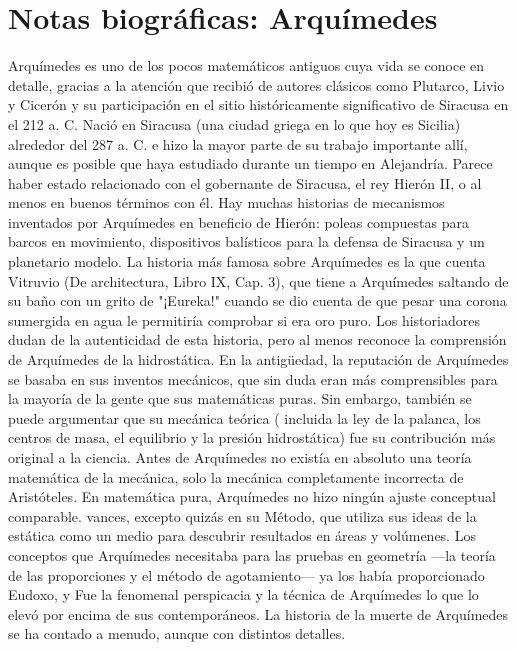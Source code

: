 \documentclass{book}
\begin{document}
    \section{Notas biográficas: Arquímedes}
    Arquímedes es uno de los pocos matemáticos antiguos cuya vida se conoce en detalle, gracias a 
    la atención que recibió de autores clásicos como Plutarco, Livio y Cicerón y su participación 
    en el sitio históricamente significativo de Siracusa en el 212 a. C. Nació en Siracusa 
    (una ciudad griega en lo que hoy es Sicilia) alrededor del 287 a. C. e hizo la mayor parte 
    de su trabajo importante allí, aunque es posible que haya estudiado durante un tiempo en 
    Alejandría. Parece haber estado relacionado con el gobernante de Siracusa, el rey Hierón 
    II, o al menos en buenos términos con él. Hay muchas historias de mecanismos inventados 
    por Arquímedes en beneficio de Hierón: poleas compuestas para barcos en movimiento, dispositivos 
    balísticos para la defensa de Siracusa y un planetario modelo. La historia más famosa 
    sobre Arquímedes es la que cuenta Vitruvio (De architectura, Libro IX, Cap. 3), que tiene a 
    Arquímedes saltando de su baño con un grito de "¡Eureka!" cuando se dio cuenta de que pesar 
    una corona sumergida en agua le permitiría comprobar si era oro puro. Los historiadores dudan 
    de la autenticidad de esta historia, pero al menos reconoce la comprensión de Arquímedes de la 
    hidrostática. En la antigüedad, la reputación de Arquímedes se basaba en sus inventos mecánicos, 
    que sin duda eran más comprensibles para la mayoría de la gente que
    sus matemáticas puras. Sin embargo, también se puede argumentar que su mecánica teórica (
    incluida la ley de la palanca, los centros de masa, el equilibrio y la presión hidrostática) 
    fue su contribución más original a la ciencia. Antes de Arquímedes no existía en absoluto una 
    teoría matemática de la mecánica, solo la mecánica completamente incorrecta de Aristóteles. 
    En matemática pura, Arquímedes no hizo ningún ajuste conceptual comparable.
    vances, excepto quizás en su Método, que utiliza sus ideas de la estática como un medio para 
    descubrir resultados en áreas y volúmenes. Los conceptos que Arquímedes necesitaba para las 
    pruebas en geometría —la teoría de las proporciones y el método de agotamiento— ya los había 
    proporcionado Eudoxo, y
    Fue la fenomenal perspicacia y la técnica de Arquímedes lo que lo elevó por encima de sus 
    contemporáneos.
    La historia de la muerte de Arquímedes se ha contado a menudo, aunque con distintos detalles. 
\end{document}
